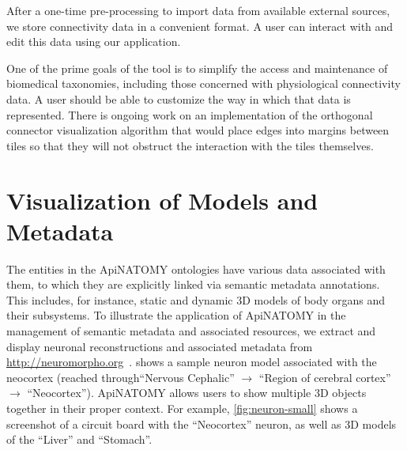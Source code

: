 After a one-time pre-processing to import data from available external sources, we store connectivity data in a convenient format. A user can interact with and edit this data using our application.

One of the prime goals of the tool is to simplify the access and maintenance of biomedical taxonomies, including those concerned with physiological connectivity data. A user should be able to customize the way in which that data is represented. There is ongoing work on an implementation of the orthogonal connector visualization algorithm that would place edges into margins between tiles so that they will not obstruct the interaction with the tiles themselves.


\section{Visualization of Models and Metadata} \label{sect:visualization2}               %

The entities in the ApiNATOMY ontologies have various data associated with them, to which they are explicitly linked via semantic metadata annotations. This includes, for instance, static and dynamic 3D models of body organs and their subsystems.
To illustrate the application of ApiNATOMY in the management of semantic metadata and associated resources, we extract and display neuronal reconstructions and associated metadata from \url{http://neuromorpho.org}~\cite{Asc06}.
 shows a sample neuron model associated with the neocortex (reached through``Nervous Cephalic'' $\rightarrow$ ``Region of cerebral cortex'' $\rightarrow$ ``Neocortex''). ApiNATOMY allows users to show multiple 3D objects together in their proper context. For example, \cref{fig:neuron-small} shows a screenshot of a circuit board with the ``Neocortex'' neuron, as well as 3D models of the ``Liver'' and ``Stomach''.

